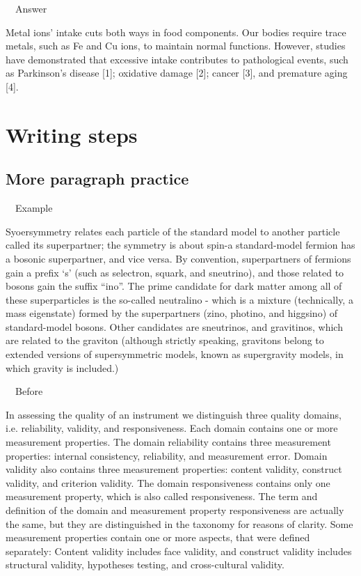\documentclass[a4paper, 12pt]{article}
\begin{document}
\par\ \textbullet\ Answer

\par Metal ions' intake cuts both ways in food components. Our bodies require trace metals, such as Fe and Cu ions, to maintain normal functions.
However, studies have demonstrated that excessive intake contributes to pathological events,
such as Parkinson's disease [1]; oxidative damage [2]; cancer [3], and premature aging [4].

\newpage\section{Writing steps}

\subsection{More paragraph practice}

\par\ \textbullet\ Example
\par Syoersymmetry relates each particle of the standard model to another particle called its superpartner;
the symmetry is about spin-a standard-model fermion has a bosonic superpartner, and vice versa.
By convention, superpartners of fermions gain a prefix `s' (such as selectron, squark, and sneutrino), and those related to bosons gain the suffix ``ino''.
The prime candidate for dark matter among all of these superparticles is the so-called neutralino - which is a mixture (technically, a mass eigenstate) formed by the superpartners (zino, photino, and higgsino) of standard-model bosons. Other candidates are sneutrinos, and gravitinos, which are related to the graviton (although strictly speaking, gravitons belong to extended versions of supersymmetric models, known as supergravity models, in which gravity is included.)

\par\ \textbullet\ Before
\par In assessing the quality of an instrument we distinguish three quality domains,
i.e. reliability, validity, and responsiveness. Each domain contains one or more measurement properties.
The domain reliability contains three measurement properties: internal consistency, reliability, and measurement error.
Domain validity also contains three measurement properties: content validity, construct validity, and criterion validity.
The domain responsiveness contains only one measurement property, which is also called responsiveness.
The term and definition of the domain and measurement property responsiveness are actually the same, but they are distinguished in the taxonomy for reasons of clarity.
Some measurement properties contain one or more aspects, that were defined separately: Content validity includes face validity,
and construct validity includes structural validity, hypotheses testing, and cross-cultural validity.
\end{document}
